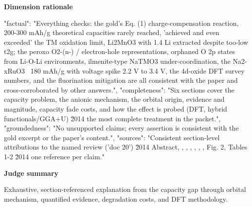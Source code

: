 \documentclass[10pt]{article}
\begin{document}
\textbf{Dimension rationale}
\begin{EvidenceText}
{
  "factual": "Everything checks: the gold's Eq. (1) charge-compensation reaction, 200-300 mAh/g theoretical capacities rarely reached, 'achieved and even exceeded' the TM oxidation limit, Li2MnO3 with 1.4 Li extracted despite too-low t2g; the peroxo O2-(n-) / electron-hole representations, orphaned O 2p states from Li-O-Li environments, ilmenite-type NaTMO3 under-coordination, the Na2-xRuO3 ~180 mAh/g with voltage spike 2.2 V to 3.4 V, the 4d-oxide DFT survey numbers, and the fluorination mitigation are all consistent with the paper and cross-corroborated by other answers.",
  "completeness": "Six sections cover the capacity problem, the anionic mechanism, the orbital origin, evidence and magnitude, capacity fade costs, and how the effect is probed (DFT, hybrid functionals/GGA+U) \u2014 the most complete treatment in the packet.",
  "groundedness": "No unsupported claims; every assertion is consistent with the gold excerpt or the paper's content.",
  "sources": "Consistent section-level attributions to the named review ('doc 20') \u2014 Abstract, , , , , , , Fig. 2, Tables 1-2 \u2014 one reference per claim."
}
\end{EvidenceText}

\textbf{Judge summary}
\begin{EvidenceText}
Exhaustive, section-referenced explanation from the capacity gap through orbital mechanism, quantified evidence, degradation costs, and DFT methodology.
\end{EvidenceText}
\end{document}
